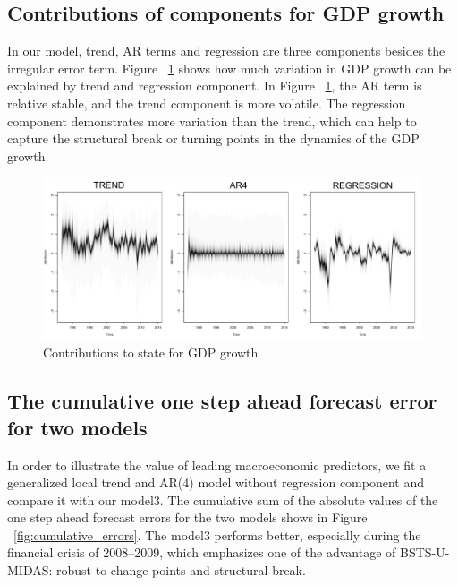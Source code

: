 \subsection{Contributions of components for GDP growth}

In our model, trend, AR terms and regression are three components besides the irregular error term. 
Figure  ~\ref{fig:components} shows how much variation in GDP growth can be explained by trend and regression component. In Figure  ~\ref{fig:components}, the AR term is relative stable, and the trend component is more volatile. The regression component demonstrates more variation than the trend, which can help to capture the structural break or turning points in the  dynamics of the GDP growth. 


\begin{figure}[h]
	\centering
	\includegraphics[width=1\linewidth]{Figures/components}
	\caption{Contributions to state for GDP growth}
	\label{fig:components}
\end{figure}




\subsection{The cumulative one step ahead forecast error for two models}

In order to illustrate the value of leading macroeconomic predictors, we fit a generalized local trend and AR(4) model without regression component and compare it with our model3.  The cumulative sum of the absolute values of the one step ahead forecast errors for the two models shows in Figure ~\ref{fig:cumulative_errors}. The model3 performs better, especially during the financial crisis of 2008–2009, which emphasizes one of the advantage of BSTS-U-MIDAS: robust to change points and structural break.  


